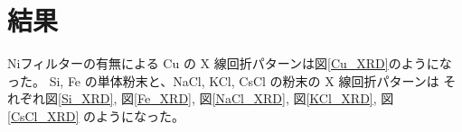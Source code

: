 \documentclass[11pt,dvipdfmx,a4paper]{jsarticle}
\begin{document}
\section{結果}
Niフィルターの有無による Cu の X 線回折パターンは図\ref{Cu_XRD}のようになった。
Si, Fe の単体粉末と、NaCl, KCl, CsCl の粉末の X 線回折パターンは
それぞれ図\ref{Si_XRD}, 図\ref{Fe_XRD}, 図\ref{NaCl_XRD}, 図\ref{KCl_XRD}, 図\ref{CsCl_XRD} のようになった。
\end{document}
